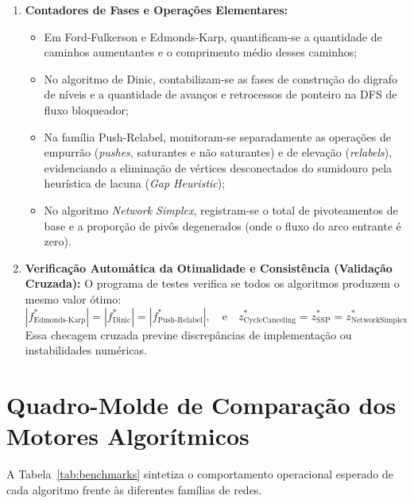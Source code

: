 \begin{enumerate}
    \item \textbf{Contadores de Fases e Operações Elementares:}
    \begin{itemize}
        \item Em Ford-Fulkerson e Edmonds-Karp, quantificam-se a quantidade de caminhos aumentantes e o comprimento médio desses caminhos;
        \item No algoritmo de Dinic, contabilizam-se as fases de construção do digrafo de níveis e a quantidade de avanços e retrocessos de ponteiro na DFS de fluxo bloqueador;
        \item Na família Push-Relabel, monitoram-se separadamente as operações de empurrão (\textit{pushes}, saturantes e não saturantes) e de elevação (\textit{relabels}), evidenciando a eliminação de vértices desconectados do sumidouro pela heurística de lacuna (\textit{Gap Heuristic});
        \item No algoritmo \textit{Network Simplex}, registram-se o total de pivoteamentos de base e a proporção de pivôs degenerados (onde o fluxo do arco entrante é zero).
    \end{itemize}

    \item \textbf{Verificação Automática da Otimalidade e Consistência (Validação Cruzada):} O programa de testes verifica se todos os algoritmos produzem o mesmo valor ótimo:
    \begin{equation}
        |f^*_{\text{Edmonds-Karp}}| = |f^*_{\text{Dinic}}| = |f^*_{\text{Push-Relabel}}|, \quad \text{e} \quad z^*_{\text{CycleCanceling}} = z^*_{\text{SSP}} = z^*_{\text{NetworkSimplex}}
    \end{equation}
    Essa checagem cruzada previne discrepâncias de implementação ou instabilidades numéricas.
\end{enumerate}


\section{Quadro-Molde de Comparação dos Motores Algorítmicos}

A Tabela~\ref{tab:benchmarks} sintetiza o comportamento operacional esperado de cada algoritmo frente às diferentes famílias de redes.

